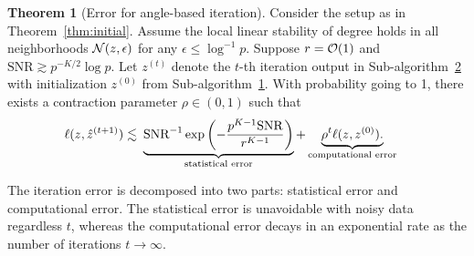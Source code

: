 \documentclass[lettersize,onecolumn,journal]{IEEEtran}
\theoremstyle{definition}
\newtheorem{thm}{Theorem}
\theoremstyle{definition}
\newcommand{\of}[1]{\left(#1\right)}
\newcommand*{\KeepStyleUnderBrace}[1]{%
  \mathop{%
    \mathchoice
    {\underbrace{\displaystyle#1}}%
    {\underbrace{\textstyle#1}}%
    {\underbrace{\scriptstyle#1}}%
    {\underbrace{\scriptscriptstyle#1}}%
  }\limits
}
\begin{document}

\begin{thm}[Error for angle-based iteration]\label{thm:refinement} Consider the setup as in Theorem~\ref{thm:initial}. Assume the local linear stability of degree holds in all neighborhoods $\mathcal{N}(z,\epsilon)$ for any $\epsilon \leq \log^{-1}p$. Suppose 
$r=\mathcal{O}(1)$ and $\text{SNR} \gtrsim  p^{-K/2}\log p$. Let $z^{(t)}$ denote the $t$-th iteration output in Sub-algorithm~\hyperref[alg:main]{2} with initialization $z^{(0)}$ from Sub-algorithm~\hyperref[alg:main]{1}. With probability going to 1, there exists a contraction parameter $\rho \in (0,1)$ such that 
\begin{align}\label{eq:final}
    \ell(z, \hat z^{(t+1)}) \lesssim &\ \KeepStyleUnderBrace{
   \text{SNR}^{-1}
    \exp\of{- \frac{p^{K-1}\text{SNR}}{r^{K-1}}}}_{\substack{\text{statistical error}} }+ \KeepStyleUnderBrace{ \rho^t \ell(z, z^{(0)}). }_{\substack{\text{computational error}}}
\end{align}
\end{thm}
The iteration error is decomposed into two parts: statistical error and computational error. The statistical error is unavoidable with noisy data regardless $t$, whereas the computational error decays in an exponential rate as the number of iterations $t \rightarrow \infty$. 
\end{document}
